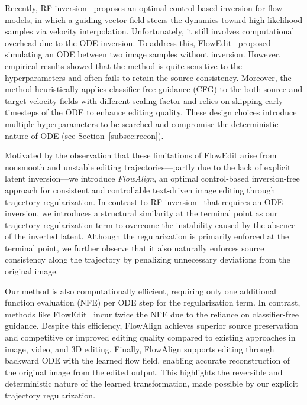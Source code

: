Recently, RF-inversion~\cite{rout2025semantic} proposes an optimal-control based inversion for flow models, in which a guiding vector field steers the dynamics toward high-likelihood samples via velocity interpolation.
Unfortunately, it still involves computational overhead due to the ODE inversion. To address this, FlowEdit~\cite{kulikov2024flowedit}  proposed simulating an ODE between two image samples without inversion. However, 
empirical results showed that the method is quite sensitive to the hyperparameters and often fails to retain the source consistency.
Moreover,
the method heuristically applies classifier-free-guidance (CFG) to the both source and target velocity fields with different scaling factor and relies on skipping early timesteps of the ODE to enhance editing quality. These design choices introduce multiple hyperparameters to be searched and compromise the deterministic nature of ODE (see Section~\ref{subsec:recon}).

Motivated by the observation that these limitations of FlowEdit arise from nonsmooth and unstable editing trajectories—partly due to the lack of explicit latent inversion—we introduce {\em FlowAlign}, an optimal control-based  inversion-free approach for consistent and controllable text-driven image editing through trajectory regularization.
In contrast to  RF-inversion~\cite{rout2025semantic} that requires an ODE inversion,
we introduces a structural similarity at the terminal point as our trajectory regularization term to overcome the instability caused by the absence of the inverted latent.
Although the regularization is primarily enforced at the terminal point,
we further observe that it also naturally enforces source consistency along the trajectory by penalizing unnecessary deviations from the original image. 

Our method is also computationally efficient, requiring only one additional function evaluation (NFE) per ODE step for the regularization term. In contrast, methods like FlowEdit~\cite{kulikov2024flowedit} incur twice the NFE due to the reliance on classifier-free guidance. Despite this efficiency, FlowAlign achieves superior source preservation and competitive or improved editing quality compared to existing approaches
in image, video, and 3D editing. Finally, FlowAlign supports editing through backward ODE with the learned flow field, enabling accurate reconstruction of the original image from the edited output. This highlights the reversible and deterministic nature of the learned transformation, made possible by our explicit trajectory regularization.

